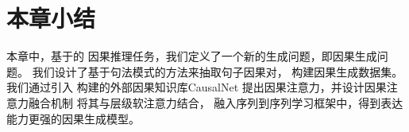 \section{本章小结}
\label{sec:causalgen-conclusion}
本章中，基于的
因果推理任务，我们定义了一个新的生成问题，即因果生成问题。
我们设计了基于句法模式的方法来抽取句子因果对，
构建因果生成数据集。
我们通过引入
构建的外部因果知识库CausalNet
提出因果注意力，并设计因果注意力融合机制
将其与层级软注意力结合，
融入序列到序列学习框架中，得到表达能力更强的因果生成模型。

